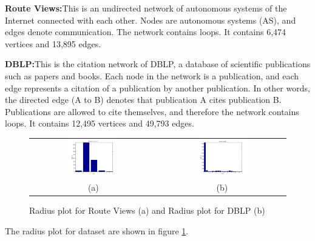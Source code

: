 \begin{description}
	\item{{\bf Route Views\cite{konect:2013:as20000102, konect:DBLP}:}}{This is an undirected network of autonomous systems of the Internet connected with each other. Nodes are autonomous systems (AS), and edges denote communication. The network contains loops. It contains 6,474 vertices and 13,895 edges.}
	\item{{\bf DBLP\cite{konect:2013:dblp-cite, konect:DBLP}:}}{This is the citation network of DBLP, a database of scientific publications such as papers and books. Each node in the network is a publication, and each edge represents a citation of a publication by another publication. In other words, the directed edge (A to B) denotes that publication A cites publication B. Publications are allowed to cite themselves, and therefore the network contains loops. It contains 12,495 vertices and 49,793 edges.}
\end{description}

\begin{figure}[htbf]
\begin{center}
\begin{tabular}{cc}
     \includegraphics[width=0.4\textwidth]{FIG/route_radius.png} &
     \includegraphics[width=0.4\textwidth]{FIG/dblp_radius.png} \\
    (a) & (b) 
\end{tabular}
\caption{Radius plot for Route Views (a) and Radius plot for DBLP (b)}
\label{fig:radius_plot}
\end{center}
\end{figure}

The radius plot for dataset are shown in figure \ref{fig:radius_plot}. 

